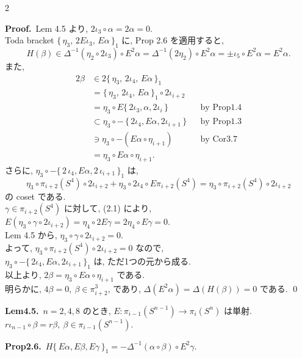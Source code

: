 \documentclass[10pt, leqno]{ltjsarticle}
\newcommand{\toda}[1]{\{\,#1\,\}}              %
\newcommand{\todai}[2][]{\{\,#2\,\}_{#1}}      %
\newcommand{\pis}[2]{\pi_{#1}(#2)}       %
\numberwithin{equation}{section}
\theoremstyle{plain}
\theoremstyle{definition}
\theoremstyle{remark}
\begin{document}
\begin{paracol}{2}

\noindent
\textbf{Proof.}\ 
Lem 4.5 より, \(2\iota_3\circ \alpha=2\alpha=0\). \\
Toda bracket 
\(\todai[1]{\eta_3,\,2E\iota_3,\,E\alpha}\) に, 
Prop 2.6 を適用すると, 
\[
H(\beta)\in \Delta^{-1}(\eta_2\circ 2\iota_3)\circ E^{2}\alpha
= \Delta^{-1}(2\eta_2)\circ E^{2}\alpha
= \pm \iota_5\circ E^{2}\alpha
= E^{2}\alpha.
\]
また,
\[
\begin{align*}
2\beta
& \in  2\todai[1]{\eta_3,\,2\iota_4,\,E\alpha}\\
& =  
\todai[1]{\eta_3,\,2\iota_4,\,E\alpha}\circ 2\iota_{i+2}\\
& =  
\eta_3\circ E\toda{2\iota_3,\alpha,2\iota_{i}} 
&& \text{by Prop1.4}\\
& \subset 
\eta_3\circ -\,\toda{2\iota_{4},E\alpha,2\iota_{i+1}}
&& \text{by Prop1.3}\\
& \ni  
\eta_3\circ -(E\alpha\circ\eta_{i+1})
&& \text{by Cor3.7}\\
& =  \eta_3\circ E\alpha\circ \eta_{i+1}.
\end{align*}
\]
さらに, 
\(\eta_3\circ -\todai[1]{2\,\iota_{4},E\alpha,2\,\iota_{i+1}}\) は,
\[
\eta_3\circ \pi_{i+2}(S^{4})\circ 2\iota_{i+2} + \eta_3\circ2\iota_4\circ E\pi_{i+2}(S^4) = \eta_3\circ\pi_{i+2}(S^4)\circ2\iota_{i+2}
\] 
の coset である. \\
\(\gamma\in\pi_{i+2}(S^4)\) に対して, (2.1) により, 
\(E(\eta_3\circ\gamma\circ2\iota_{i+2})=\eta_4\circ2E\gamma
=2\eta_4\circ E\gamma=0 .\)\\
Lem 4.5 から, \(\eta_3\circ\gamma\circ2\iota_{i+2}=0 .\)\\
よって, \(\eta_3\circ\pi_{i+2}(S^4)\circ2\iota_{i+2}=0\) なので, \\
\(\eta_3\circ - \todai[1]{2\iota_4,E\alpha,2\iota_{i+1}}\)
は, ただ1つの元から成る. \\
以上より, \(2\beta=\eta_3\circ E\alpha\circ\eta_{i+1}\) である. \\
明らかに, 
\(4\beta=0,\ \beta\in\pi^{3}_{i+2}\), であり,
\(\Delta(E^{2}\alpha)=\Delta(H(\beta))=0\) である. 
\qed

\switchcolumn

\noindent
\textbf{Lem4.5.}\
\(n=2,4,8\) のとき, 
\(E:\pis{i-1}{S^{n-1}}\to\pis{i}{S^n}\) は単射.\\ 
\(r\iota_{n-1}\circ\beta = r\beta,\ \beta\in\pis{i-1}{S^{n-1}}\).

\noindent
\textbf{Prop2.6.}\
\(H\todai[1]{E\alpha, E\beta, E\gamma} 
= -\Delta^{-1}(\alpha\circ\beta)\circ E^2\gamma.\)


\end{paracol}
\end{document}
